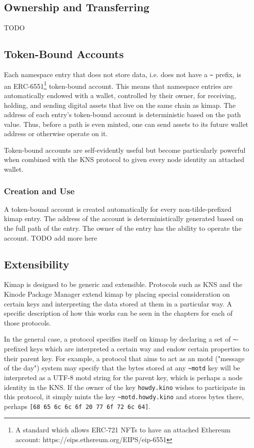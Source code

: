 \documentclass[runningheads]{llncs}
\begin{document}
\subsection{Ownership and Transferring}

TODO

\subsection{Token-Bound Accounts}

Each namespace entry that does not store data, i.e. does not have a \verb|~| prefix, is an ERC-6551\footnote{A standard which allows ERC-721 NFTs to have an attached Ethereum account:  https://eips.ethereum.org/EIPS/eip-6551} token-bound account.
This means that namespace entries are automatically endowed with a wallet, controlled by their owner, for receiving, holding, and sending digital assets that live on the same chain as kimap.
The address of each entry's token-bound account is deterministic based on the path value.
Thus, before a path is even minted, one can send assets to its future wallet address or otherwise operate on it.

Token-bound accounts are self-evidently useful but become particularly powerful when combined with the KNS protocol to given every node identity an attached wallet.

\subsubsection{Creation and Use}

A token-bound account is created automatically for every non-tilde-prefixed kimap entry.
The address of the account is deterministically generated based on the full path of the entry.
The owner of the entry has the ability to operate the account.
TODO add more here

\subsection{Extensibility}
\label{sec:extensibility}

Kimap is designed to be generic and extensible.
Protocols such as KNS and the Kinode Package Manager extend kimap by placing special consideration on certain keys and interpreting the data stored at them in a particular way.
A specific description of how this works can be seen in the chapters for each of those protocols.

In the general case, a protocol specifies itself on kimap by declaring a set of \verb|~|-prefixed keys which are interpreted a certain way and endow certain properties to their parent key. For example, a protocol that aims to act as an motd ("message of the day") system may specify that the bytes stored at any \verb|~motd| key will be interpreted as a UTF-8 motd string for the parent key, which is perhaps a node identity in the KNS. If the owner of the key \verb|howdy.kino| wishes to participate in this protocol, it simply mints the key \verb|~motd.howdy.kino| and stores bytes there, perhaps \verb|[68 65 6c 6c 6f 20 77 6f 72 6c 64]|.
\end{document}
